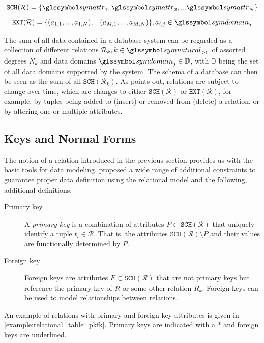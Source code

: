 \begin{equation}
    \mathtt{SCH}(\mathcal{R}) = \lbrace \symattr_1, \symattr_2, ... \symattr_N \rbrace
\end{equation}

\begin{equation}
    \mathtt{EXT}(\mathcal{R}) = \lbrace (a_{1,1}, ..., a_{1,N}), ... (a_{M,1}, ..., a_{M,N})\rbrace, a_{i,j} \in \symdomain_j 
\end{equation}

The sum of all data contained in a database system can be regarded as a collection of different relations $\mathcal{R}_k, k \in \symnatural_{\geq 0}$ of assorted degrees $N_k$ and data domains $\symdomain_j \in \mathbb{D}$, with $\mathbb{D}$ being the set of all data domains supported by the system. The schema of a database can then be seen as the sum of all $\mathtt{SCH}(\mathcal{R}_k)$. As \cite{Codd:1970Relational} points out, relations are subject to change over time, which are changes to either $\mathtt{SCH}(\mathcal{R})$ or $\mathtt{EXT}(\mathcal{R})$, for example, by tuples being added to (insert) or removed from (delete) a relation, or by altering one or multiple attributes.


\subsection{Keys and Normal Forms}

The notion of a relation introduced in the previous section provides us with the basic tools for data modeling. \cite{Codd:1970Relational} proposed a wide range of additional constraints to guarantee proper data definition using the relational model and the following, additional definitions. 

\begin{description}
    \item[Primary key] A \emph{primary key} is a combination of attributes $P \subset \mathtt{SCH}(\mathcal{R})$ that uniquely identify a tuple $t_i \in \mathcal{R}$. That is, the attributes $\mathtt{SCH}(\mathcal{R}) \setminus P$ and their values are functionally determined by $P$.
    \item[Foreign key] Foreign keys are attributes $F \subset \mathtt{SCH}(\mathcal{R})$ that are not primary keys but reference the primary key of $R$ or some other relation $R_k$. Foreign keys can be used to model relationships between relations.
\end{description}

An example of relations with primary and foreign key attributes is given in \cref{example:relational_table_pkfk}. Primary keys are indicated with a * and foreign keys are underlined.

